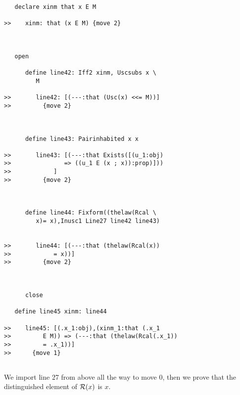 \documentclass[12pt]{article}
\begin{document}
\begin{verbatim}
   declare xinm that x E M

>>    xinm: that (x E M) {move 2}



   open

      define line42: Iff2 xinm, Uscsubs x \
         M

>>       line42: [(---:that (Usc(x) <<= M))]
>>         {move 2}



      define line43: Pairinhabited x x

>>       line43: [(---:that Exists([(u_1:obj)
>>               => ((u_1 E (x ; x)):prop)]))
>>            ]
>>         {move 2}



      define line44: Fixform((thelaw(Rcal \
         x)= x),Inusc1 Line27 line42 line43)


>>       line44: [(---:that (thelaw(Rcal(x))
>>            = x))]
>>         {move 2}



      close

   define line45 xinm: line44

>>    line45: [(.x_1:obj),(xinm_1:that (.x_1
>>         E M)) => (---:that (thelaw(Rcal(.x_1))
>>         = .x_1))]
>>      {move 1}


\end{verbatim}

We import line 27 from above all the way to move 0, then we prove that the distinguished element of ${\cal R}(x)$ is $x$.
\end{document}
